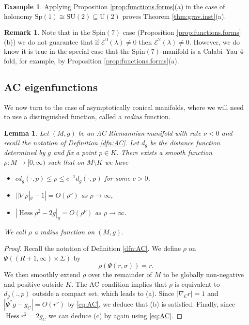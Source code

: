 \documentclass{article}
\newtheorem{lem}[thm]{Lemma}
\theoremstyle{definition}
\newtheorem{rmk}[thm]{Remark}
\newtheorem{eg}[thm]{Example}
\numberwithin{thm}{section}
\numberwithin{equation}{section}
\DeclareMathOperator\Hess{Hess}
\begin{document}
\begin{eg}  Applying
Proposition \ref{prop:functions.forms}(a) in the case of holonomy $\mathrm{Sp}(1)\cong\mathrm{SU}(2)\subseteq\mathrm{U}(2)$  proves Theorem \ref{thm:grav.inst}(a).
\end{eg}

\begin{rmk}
Note that  in the $\mathrm{Spin}(7)$ case (Proposition \ref{prop:functions.forms}(b)) we do not guarantee that if $\mathcal{E}^0(\lambda)\neq 0$ then $\mathcal{E}^2(\lambda)\neq 0$.  However, we do know it is true in the special case that the $\mathrm{Spin}(7)$-manifold is a Calabi--Yau 4-fold, for example, by Proposition \ref{prop:functions.forms}(a).
\end{rmk}

\subsection{AC eigenfunctions}

We now turn to the case of asymptotically conical manifolds, where we will need to use a distinguished function, called a \emph{radius} function. 

\begin{lem}\label{lem:radius} Let $(M,g)$ be an AC Riemannian manifold with rate $\nu<0$ and recall the notation of Definition \ref{dfn:AC}. Let $d_g$ be the distance function determined by $g$ and fix a point $p\in K$. 
    There exists a smooth function $\rho:M\to [0,\infty)$ such that  on $M\setminus K$ we have
    \begin{itemize}
\item[(a)]    $cd_g(\cdot,p)\leq \rho\leq c^{-1}d_g(\cdot,p)$ for some $c>0$,
\item[(b)] $||\nabla\rho|_g-1|=O(\rho^{\nu})$ as $\rho\to\infty$,
\item[(c)] $|\Hess\rho^2 -2g|_g=O(\rho^{\nu})$ as $\rho\to\infty$.
    \end{itemize}
    We call $\rho$ a radius function on $(M,g)$.
\end{lem}

\begin{proof}
Recall the notation of Definition \ref{dfn:AC}. 
We define $\rho$ on $\Psi((R+1,\infty)\times\Sigma)$ by 
\begin{equation}\label{eq:radius}
    \rho(\Psi(r,\sigma))=r.
\end{equation}
We then smoothly extend $\rho$ over the remainder of $M$ to be globally non-negative and positive outside $K$.  The AC condition implies that $\rho$ is equivalent to $d_g(.,p)$ outside a compact set, which leads to (a).  Since $|\nabla_Cr|=1$ and $|\Psi^*g-g_C|=O(r^{\nu})$ by \eqref{eq:AC}, we deduce that (b) is satisfied.  Finally, since $\Hess r^2=2g_C$ we can deduce (c) by again using \eqref{eq:AC}.  
\end{proof}
\end{document}
